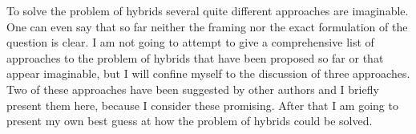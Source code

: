 \documentclass[12pt, a4paper]{article}
\numberwithin{equation}{section}
\begin{document}
To solve the problem of hybrids several quite different approaches are imaginable. One can even say that so far neither the framing nor the exact formulation of the question is clear. I am not going to attempt to give a comprehensive list of approaches to the problem of hybrids that have been proposed so far or that appear imaginable, but I will confine myself to the discussion of three approaches. Two of these approaches have been suggested by other authors and I briefly present them here, because I consider these promising. After that I am going to present my own best guess at how the problem of hybrids could be solved. 

%
%
%
%
\end{document}
